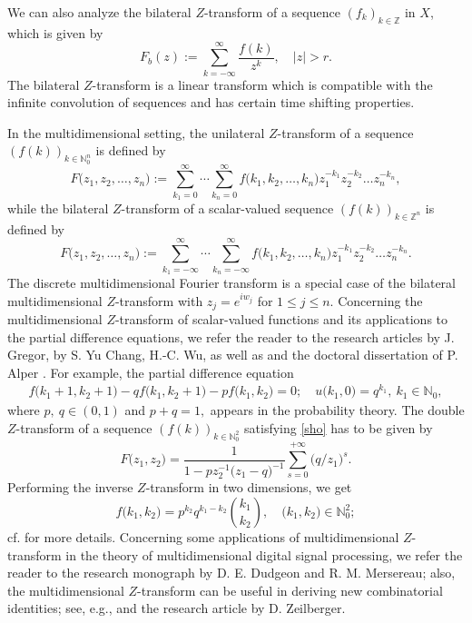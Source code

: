 \documentclass{amsart}
\theoremstyle{definition}
\theoremstyle{remark}
\numberwithin{equation}{section}
\begin{document}
We can also analyze the bilateral $Z$-transform of a sequence $(f_{k})_{k\in {\mathbb Z}}$ in $X$, which is given by
$$
F_{b}(z):=\sum_{k=-\infty}^{\infty}\frac{f(k)}{z^{k}},\quad |z|>r.
$$
The bilateral $Z$-transform is a linear transform which is compatible with the infinite convolution of sequences and has certain time shifting properties.  

In the  multidimensional  setting, the unilateral $Z$-transform of a sequence $(f (k))_{ k\in {\mathbb N}_{0}^{n}}$  is defined by
$$
{\displaystyle F\bigl(z_{1},z_{2},\ldots ,z_{n}\bigr):=\sum _{k_{1}=0}^{\infty }\cdots \sum _{k_{n}=0 }^{\infty }f\bigl(k_{1},k_{2},\ldots ,k_{n}\bigr)z_{1}^{-k_{1}}z_{2}^{-k_{2}}\ldots z_{n}^{-k_{n}}},
$$
while the bilateral $Z$-transform of a scalar-valued sequence $(f (k))_{ k\in {\mathbb Z}^{n}}$  is defined by
$$
{\displaystyle F\bigl(z_{1},z_{2},\ldots ,z_{n}\bigr):=\sum _{k_{1}=-\infty }^{\infty }\cdots \sum _{k_{n}=-\infty }^{\infty }f\bigl(k_{1},k_{2},\ldots ,k_{n}\bigr)z_{1}^{-k_{1}}z_{2}^{-k_{2}}\ldots z_{n}^{-k_{n}}}.
$$
The discrete multidimensional Fourier transform is a special case of the bilateral multidimensional $Z$-transform with
$
{\textstyle z_{j}=e^{iw_{j}}}$ for $1\leq j\leq n.$ 
Concerning the multidimensional $Z$-transform of scalar-valued functions and its applications to the partial difference equations, we refer the reader to the research articles \cite{gregor} by J. Gregor, \cite{tensor} by S. Yu Chang, H.-C. Wu, as well as \cite[Section 2.7]{jury} and the doctoral dissertation of P. Alper \cite{alper}. 
For example, the partial difference equation 
\begin{align}\label{sho}
f\bigl(k_{1}+1,k_{2}+1\bigr)-qf\bigl(k_{1},k_{2}+1\bigr)-pf\bigl(k_{1},k_{2}\bigr)=0;\quad u\bigl(k_{1},0\bigr)=q^{k_{1}},\ k_{1}\in {\mathbb N}_{0},
\end{align}
where $p,\ q\in (0,1)$ and $p+q=1,$ appears in the probability theory. The double  $Z$-transform of a sequence $(f (k))_{ k\in {\mathbb N}_{0}^{2}}$ satisfying \eqref{sho} has to be given by
$$
F\bigl(z_{1},z_{2}\bigr)=\frac{1}{1-p z_{2}^{-1}\bigl(z_{1}-q \bigr)^{-1}}\sum_{s=0}^{+\infty}\bigl(q/z_{1}\bigr)^{s}.
$$
Performing the inverse $Z$-transform in two dimensions, we get
$$
f\bigl(k_{1},k_{2}\bigr)=p^{k_{2}}q^{k_{1}-k_{2}}\binom{k_{1}}{k_{2}},\quad \bigl(k_{1},k_{2}\bigr)\in {\mathbb N}_{0}^{2};
$$
cf. \cite[pp. 74--76]{jury} for more details. Concerning some applications of multidimensional $Z$-transform in the theory of multidimensional digital signal processing, we refer the reader to the research monograph
\cite{dud} by D. E. Dudgeon and R. M. Mersereau; 
also, the multidimensional $Z$-transform can be useful in deriving new combinatorial
identities; see, e.g., \cite[Example 3.2.4]{gregor} and the research article \cite{zeil} by D. Zeilberger. 
\end{document}
